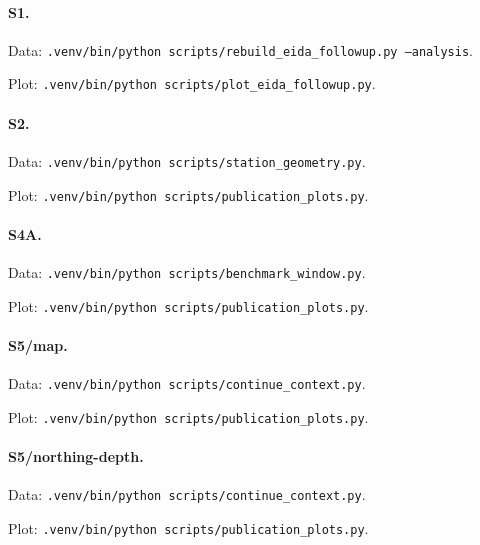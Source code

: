 \paragraph{S1.}
\par Data: \texttt{.venv/bin/python scripts/rebuild\_eida\_followup.py --analysis}.
\par Plot: \texttt{.venv/bin/python scripts/plot\_eida\_followup.py}.
\par{}
\paragraph{S2.}
\par Data: \texttt{.venv/bin/python scripts/station\_geometry.py}.
\par Plot: \texttt{.venv/bin/python scripts/publication\_plots.py}.
\par{}
\par{}
\par{}
\paragraph{S4A.}
\par Data: \texttt{.venv/bin/python scripts/benchmark\_window.py}.
\par Plot: \texttt{.venv/bin/python scripts/publication\_plots.py}.
\par{}
\par{}
\paragraph{S5/map.}
\par Data: \texttt{.venv/bin/python scripts/continue\_context.py}.
\par Plot: \texttt{.venv/bin/python scripts/publication\_plots.py}.
\par{}
\paragraph{S5/northing-depth.}
\par Data: \texttt{.venv/bin/python scripts/continue\_context.py}.
\par Plot: \texttt{.venv/bin/python scripts/publication\_plots.py}.
\par{}
